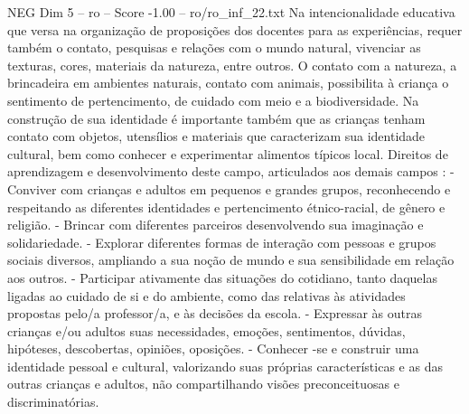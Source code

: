 \begin{textsample}{NEG Dim 5 – ro – Score -1.00 – ro/ro\_inf\_22.txt}
Na intencionalidade educativa que versa na organização de proposições dos docentes para as experiências, requer também o contato, pesquisas e relações com o mundo natural, vivenciar as texturas, cores, materiais da natureza, entre outros.
O contato com a natureza, a brincadeira em ambientes naturais, contato com animais, possibilita à criança o sentimento de pertencimento, de cuidado com meio e a biodiversidade.
Na construção de sua identidade é importante também que as crianças tenham contato com objetos, utensílios e materiais que caracterizam sua identidade cultural, bem como conhecer e experimentar alimentos típicos local.
Direitos de aprendizagem e desenvolvimento deste campo, articulados aos demais campos : - Conviver com crianças e adultos em pequenos e grandes grupos, reconhecendo e respeitando as diferentes identidades e pertencimento étnico-racial, de gênero e religião. - Brincar com diferentes parceiros desenvolvendo sua imaginação e solidariedade. - Explorar diferentes formas de interação com pessoas e grupos sociais diversos, ampliando a sua noção de mundo e sua sensibilidade em relação aos outros. - Participar ativamente das situações do cotidiano, tanto daquelas ligadas ao cuidado de si e do ambiente, como das relativas às atividades propostas pelo/a professor/a, e às decisões da escola. - Expressar às outras crianças e/ou adultos suas necessidades, emoções, sentimentos, dúvidas, hipóteses, descobertas, opiniões, oposições. - Conhecer -se e construir uma identidade pessoal e cultural, valorizando suas próprias características e as das outras crianças e adultos, não compartilhando visões preconceituosas e discriminatórias.

\end{textsample}
